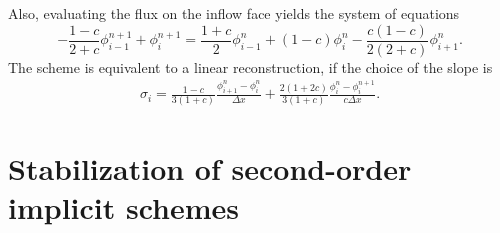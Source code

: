 \documentclass[../thesis.tex]{subfiles}
\begin{document}
Also, evaluating the flux on the inflow face yields the system of equations
\begin{equation}
    \label{eqn:implicit-ppm-system}
    -\frac{1-c}{2+c}\phi_{i-1}^{n+1}
    +\phi_{i}^{n+1}
    =
    \frac{1+c}{2}\phi_{i-1}^{n}
    +(1-c)\phi_{i}^{n}
    -\frac{c(1-c)}{2(2+c)}\phi_{i+1}^{n}.
\end{equation}
The scheme is equivalent to a linear reconstruction, if the choice of the slope is
\begin{equation}
    \label{eqn:implicit-ppm-slope}
    \begin{split}
        \sigma_{i} = \frac{1-c}{3(1+c)}
        \frac{\phi_{i+1}^{n} - \phi_{i}^{n}}
        {\Delta x}
        + \frac{2(1+2c)}{3(1+c)}
        \frac{\phi_{i}^{n} - \phi_{i}^{n+1}}
        {c \Delta x}.
    \end{split}
\end{equation}
\section[]{Stabilization of second-order implicit schemes}
\end{document}
